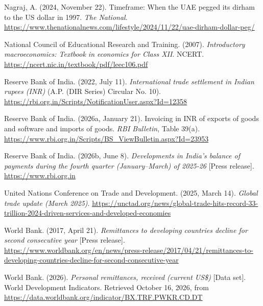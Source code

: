 Nagraj, A. (2024, November 22). Timeframe: When the UAE pegged its dirham to the US dollar in 1997. \emph{The National}. \url{https://www.thenationalnews.com/lifestyle/2024/11/22/uae-dirham-dollar-peg/}\par\smallskip
National Council of Educational Research and Training. (2007). \emph{Introductory macroeconomics: Textbook in economics for Class XII}. NCERT. \url{https://ncert.nic.in/textbook/pdf/leec106.pdf}\par\smallskip
Reserve Bank of India. (2022, July 11). \emph{International trade settlement in Indian rupees (INR)} (A.P. (DIR Series) Circular No. 10). \url{https://rbi.org.in/Scripts/NotificationUser.aspx?Id=12358}\par\smallskip
Reserve Bank of India. (2026a, January 21). Invoicing in INR of exports of goods and software and imports of goods. \emph{RBI Bulletin}, Table 39(a). \url{https://www.rbi.org.in/Scripts/BS_ViewBulletin.aspx?Id=23953}\par\smallskip
Reserve Bank of India. (2026b, June 8). \emph{Developments in India’s balance of payments during the fourth quarter (January–March) of 2025-26} [Press release]. \url{https://www.rbi.org.in}\par\smallskip
United Nations Conference on Trade and Development. (2025, March 14). \emph{Global trade update (March 2025)}. \url{https://unctad.org/news/global-trade-hits-record-33-trillion-2024-driven-services-and-developed-economies}\par\smallskip
World Bank. (2017, April 21). \emph{Remittances to developing countries decline for second consecutive year} [Press release]. \url{https://www.worldbank.org/en/news/press-release/2017/04/21/remittances-to-developing-countries-decline-for-second-consecutive-year}\par\smallskip
World Bank. (2026). \emph{Personal remittances, received (current US\$)} [Data set]. World Development Indicators. Retrieved October 16, 2026, from \url{https://data.worldbank.org/indicator/BX.TRF.PWKR.CD.DT}\par\smallskip
\endgroup
